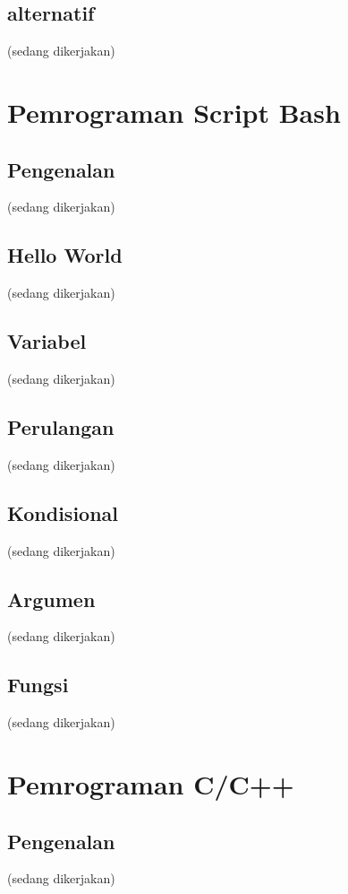 \documentclass[12pt,]{article}
\begin{document}
	\subsection{alternatif}
	(sedang dikerjakan)

	\section{Pemrograman Script Bash}

	\subsection{Pengenalan}
	(sedang dikerjakan)

	\subsection{Hello World}
	(sedang dikerjakan)

	\subsection{Variabel}
	(sedang dikerjakan)

	\subsection{Perulangan}
	(sedang dikerjakan)

	\subsection{Kondisional}
	(sedang dikerjakan)

	\subsection{Argumen}
	(sedang dikerjakan)

	\subsection{Fungsi}
	(sedang dikerjakan)

	\section{Pemrograman C/C++}

	\subsection{Pengenalan}
	(sedang dikerjakan)
\end{document}
